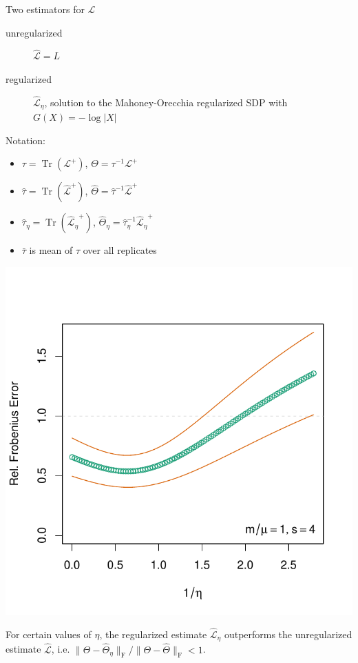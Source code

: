 \documentclass[xcolor=dvipsnames]{beamer}
\DeclareMathOperator{\Tr}{Tr}
\begin{document}
\begin{frame}
  \begin{block}{Two estimators for $\mathcal{L}$}
    \begin{description}
      \item[unregularized] $\mathcal{\hat L} = L$
      \item[regularized] $\mathcal{\hat L}_\eta$, solution to
        the Mahoney-Orecchia regularized SDP
	with $G(X) = -\log |X|$
    \end{description}
  \end{block}

  Notation:
  \vspace{-1em}
  \begin{itemize}
      \item $\tau = \Tr(\mathcal{L}^+)$, $\Theta = \tau^{-1} \mathcal{L}^+$
      \item $\hat \tau = \Tr(\mathcal{\hat L}^+)$, $\hat \Theta = \hat \tau^{-1} \mathcal{\hat L}^+$
      \item $\hat \tau_\eta = \Tr(\mathcal{\hat L_\eta}^+)$, $\hat \Theta_\eta = \hat \tau_\eta^{-1} \mathcal{\hat L_\eta}^+$
      \item $\bar \tau$ is mean of $\tau$ over all replicates
    \end{itemize}
\end{frame}

\begin{frame}
	\centering
	\includegraphics[scale=0.5]{plots/estimation-frob-p100}

	For certain values of $\eta$, the regularized estimate
	$\mathcal{\hat L}_\eta$ outperforms the unregularized
	estimate $\mathcal{\hat L}$, i.e.
	$\|\Theta - \hat \Theta_\eta\|_\mathrm{F}
	   / \|\Theta - \hat \Theta\|_\mathrm{F} < 1$.
\end{frame}
\end{document}
